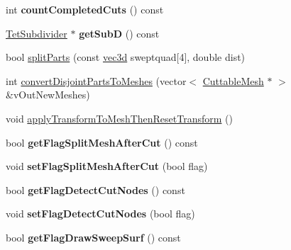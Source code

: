 \begin{DoxyCompactItemize}
\item 
\hypertarget{classps_1_1elastic_1_1CuttableMesh_aabb3fc0ca125b096110914671d7ced5d}{}int {\bfseries count\+Completed\+Cuts} () const \label{classps_1_1elastic_1_1CuttableMesh_aabb3fc0ca125b096110914671d7ced5d}

\item 
\hypertarget{classps_1_1elastic_1_1CuttableMesh_aaf49f2d8cbbaf485f6a1bcb72d00e609}{}\hyperlink{classps_1_1elastic_1_1TetSubdivider}{Tet\+Subdivider} $\ast$ {\bfseries get\+Sub\+D} () const \label{classps_1_1elastic_1_1CuttableMesh_aaf49f2d8cbbaf485f6a1bcb72d00e609}

\item 
bool \hyperlink{classps_1_1elastic_1_1CuttableMesh_a786edd24a931fe37af887798ce203916}{split\+Parts} (const \hyperlink{classps_1_1base_1_1Vec3}{vec3d} sweptquad\mbox{[}4\mbox{]}, double dist)
\item 
int \hyperlink{classps_1_1elastic_1_1CuttableMesh_a6669524e92d7a5c2784fefaa4f51d1a5}{convert\+Disjoint\+Parts\+To\+Meshes} (vector$<$ \hyperlink{classps_1_1elastic_1_1CuttableMesh}{Cuttable\+Mesh} $\ast$ $>$ \&v\+Out\+New\+Meshes)
\item 
void \hyperlink{classps_1_1elastic_1_1CuttableMesh_aee7462902722caff22b8ff0ea0ec8478}{apply\+Transform\+To\+Mesh\+Then\+Reset\+Transform} ()
\item 
\hypertarget{classps_1_1elastic_1_1CuttableMesh_a2eaa09e7afaf6c4e07cb186207124812}{}bool {\bfseries get\+Flag\+Split\+Mesh\+After\+Cut} () const \label{classps_1_1elastic_1_1CuttableMesh_a2eaa09e7afaf6c4e07cb186207124812}

\item 
\hypertarget{classps_1_1elastic_1_1CuttableMesh_a2893f36d95f74ba71800fffc36c18112}{}void {\bfseries set\+Flag\+Split\+Mesh\+After\+Cut} (bool flag)\label{classps_1_1elastic_1_1CuttableMesh_a2893f36d95f74ba71800fffc36c18112}

\item 
\hypertarget{classps_1_1elastic_1_1CuttableMesh_a32667014d30499be73e3ec1d2f9eba95}{}bool {\bfseries get\+Flag\+Detect\+Cut\+Nodes} () const \label{classps_1_1elastic_1_1CuttableMesh_a32667014d30499be73e3ec1d2f9eba95}

\item 
\hypertarget{classps_1_1elastic_1_1CuttableMesh_a6370f263fd60001ae4ca462187fc2df8}{}void {\bfseries set\+Flag\+Detect\+Cut\+Nodes} (bool flag)\label{classps_1_1elastic_1_1CuttableMesh_a6370f263fd60001ae4ca462187fc2df8}

\item 
\hypertarget{classps_1_1elastic_1_1CuttableMesh_afceffb1e083b60deede3bf263da982d5}{}bool {\bfseries get\+Flag\+Draw\+Sweep\+Surf} () const \label{classps_1_1elastic_1_1CuttableMesh_afceffb1e083b60deede3bf263da982d5}


\end{DoxyCompactItemize}
